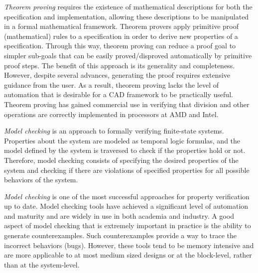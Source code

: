 {\it Theorem proving} \cite{theoremproving:91} requires the existence
of mathematical descriptions for both the specification and
implementation, allowing these descriptions to be manipulated in a
formal mathematical framework. Theorem provers apply primitive proof
(mathematical) rules to a specification in order to derive new
properties of a specification.  Through this way, theorem proving
can reduce a proof goal to simpler sub-goals  that can be easily
proved/disproved automatically by primitive proof steps. 
The benefit of this approach is its generality and
completeness. However, despite several advances, generating
the proof requires extensive guidance from the user. As a result,
theorem proving lacks the level of automation that is desirable for a
CAD framework to be practically useful. Theorem proving has gained
commercial use in verifying that division and other operations are
correctly implemented in processors at AMD and Intel. 

{\it Model checking} \cite{modelcheck:99} is an approach to formally
verifying finite-state systems.  Properties about the system are
modeled as temporal logic formulas, and the model defined by the
system is traversed to check if the properties hold or not. Therefore,
model checking consists of specifying the desired  properties of the
system and checking if there are violations of specified properties
for all possible behaviors of the system. 

{\it Model checking} is one of the most successful approaches for
property verification up to date.  Model checking tools \cite{BHEL96}
\cite{SMV} \cite{spin} have achieved a significant level of automation
and maturity and are widely in use in both academia and industry. A
good aspect of model checking that is extremely important in practice
is the ability to generate counterexamples. Such counterexamples
provide a way to trace the incorrect behaviors (bugs). However, these
tools tend to be memory intensive and are more applicable to at most
medium sized designs or at the block-level, rather than at the
system-level. 

